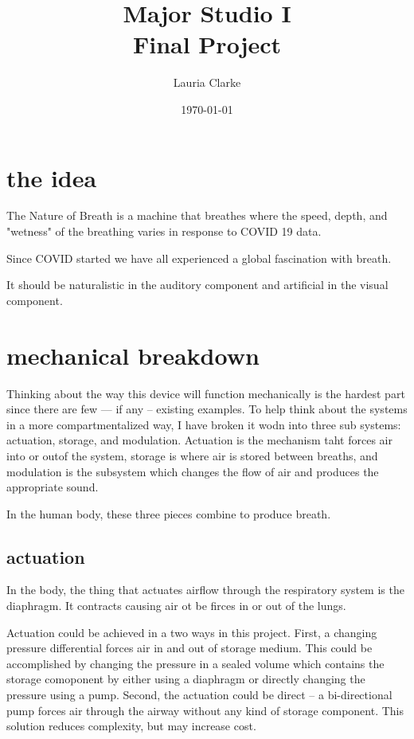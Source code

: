 \documentclass[11pt]{report}
\title{Major Studio I \\ Final Project}
\date{\today}
\author{Lauria Clarke}
\begin{document}
\maketitle
\section*{the idea}

The Nature of Breath is a machine that breathes where the speed, depth, and "wetness" of the breathing varies in response to COVID 19 data.

Since COVID started we have all experienced a global fascination with breath. 


It should be naturalistic in the auditory component and artificial in the visual component.

\section*{mechanical breakdown}

Thinking about the way this device will function mechanically is the hardest part since there are few --- if any -- existing examples. To help think about the systems in a more compartmentalized way, I have broken it wodn into three sub systems: actuation, storage, and modulation. Actuation is the mechanism taht forces air into or outof the system, storage is where air is stored between breaths, and modulation is the subsystem which changes the flow of air and produces the appropriate sound. 

In the human body, these three pieces combine to produce breath. 

\subsection*{actuation}

In the body, the thing that actuates airflow through the respiratory system is the diaphragm. It contracts causing air ot be firces in or out of the lungs. 

Actuation could be achieved in a two ways in this project. First, a changing pressure differential forces air in and out of storage medium. This could be accomplished by changing the pressure in a sealed volume which contains the storage comoponent by either using a diaphragm or directly changing the pressure using a pump. Second, the actuation could be direct -- a bi-directional pump forces air through the airway without any kind of storage component. This solution reduces complexity, but may increase cost.
\end{document}
